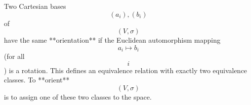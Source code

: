 Two Cartesian bases $$(a_i), (b_i)$$ of $$(V, \sigma)$$ have the same **orientation** if the Euclidean automorphism mapping $$a_i \mapsto b_i$$ (for all $$i$$) is a rotation. This defines an equivalence relation with exactly two equivalence classes. To **orient** $$(V, \sigma)$$ is to assign one of these two classes to the space.
